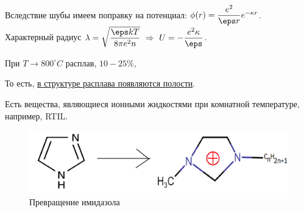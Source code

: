 
\begin{lecture}
	Вследствие шубы имеем поправку на потенциал: $ \phi (r) = \dfrac{e^2}{\eps r} e^{-\kappa r} $.
	Характерный радиус $ \lambda  = \sqrt{\dfrac{\eps k T}{8 \pi e^2 n}}~\Rightarrow~ U = -\dfrac{e^2 \kappa}{\eps}$.
	\begin{lecSection}
		При $ T \rightarrow 800^\circ C $ расплав, $ 10 - 25 \% $, %
		
		То есть, \underline{в структуре расплава появляются полости}.
		
		Есть вещества, являющиеся ионными жидкостями при комнатной температуре, например, RTIL.
		\begin{figure}[h]
			\centering\includegraphics[width=0.8\linewidth]{lecture_11/imidazole}
			\caption{Превращение имидазола}
			\label{fig:11:imid_transform}
		\end{figure}
		

\end{lecSection}
\end{lecture}
